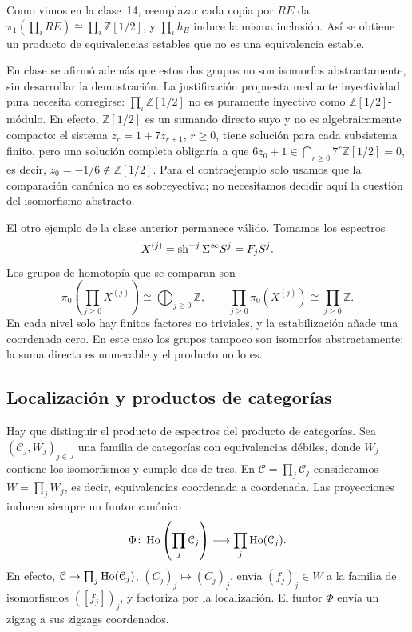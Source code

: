 \begin{ejem}
Como vimos en la clase~14, reemplazar cada copia por $RE$ da $\pi_1(\prod_iRE)\cong\prod_i\mathbb Z[1/2]$, y $\prod_ih_E$ induce la misma inclusión. Así se obtiene un producto de equivalencias estables que no es una equivalencia estable.
\end{ejem}

\begin{nota}
En clase se afirmó además que estos dos grupos no son isomorfos abstractamente, sin desarrollar la demostración. La justificación propuesta mediante inyectividad pura necesita corregirse: $\prod_i\mathbb Z[1/2]$ no es puramente inyectivo como $\mathbb Z[1/2]$-módulo. En efecto, $\mathbb Z[1/2]$ es un sumando directo suyo y no es algebraicamente compacto: el sistema $z_r=1+7z_{r+1}$, $r\ge0$, tiene solución para cada subsistema finito, pero una solución completa obligaría a que $6z_0+1\in\bigcap_{r\ge0}7^r\mathbb Z[1/2]=0$, es decir, $z_0=-1/6\notin\mathbb Z[1/2]$. Para el contraejemplo solo usamos que la comparación canónica no es sobreyectiva; no necesitamos decidir aquí la cuestión del isomorfismo abstracto.
\end{nota}

El otro ejemplo de la clase anterior permanece válido. Tomamos los espectros
\[
X^{(j)}=\operatorname{sh}^{-j}\Sigma^\infty S^j=F_jS^j.
\]
Los grupos de homotopía que se comparan son
\[
\pi_0\left(\prod_{j\ge0}X^{(j)}\right)\cong\bigoplus_{j\ge0}\mathbb Z,
\qquad
\prod_{j\ge0}\pi_0(X^{(j)})\cong\prod_{j\ge0}\mathbb Z.
\]
En cada nivel solo hay finitos factores no triviales, y la estabilización añade una coordenada cero. En este caso los grupos tampoco son isomorfos abstractamente: la suma directa es numerable y el producto no lo es.

\subsection{Localización y productos de categorías}

Hay que distinguir el producto de espectros del producto de categorías. Sea $(\mathcal C_j,W_j)_{j\in J}$ una familia de categorías con equivalencias débiles, donde $W_j$ contiene los isomorfismos y cumple dos de tres. En $\mathcal C=\prod_j\mathcal C_j$ consideramos $W=\prod_jW_j$, es decir, equivalencias coordenada a coordenada. Las proyecciones inducen siempre un funtor canónico
\[
\Phi\colon\operatorname{Ho}\left(\prod_j\mathcal C_j\right)\longrightarrow\prod_j\operatorname{Ho}(\mathcal C_j).
\]
En efecto, $\mathcal C\to\prod_j\operatorname{Ho}(\mathcal C_j)$, $(C_j)_j\mapsto(C_j)_j$, envía $(f_j)_j\in W$ a la familia de isomorfismos $([f_j])_j$, y factoriza por la localización. El funtor $\Phi$ envía un zigzag a sus zigzags coordenados.

